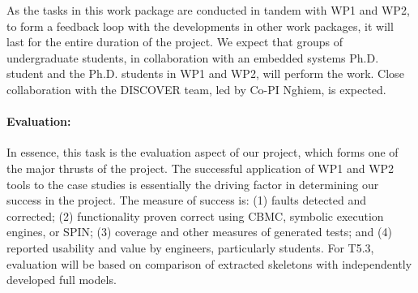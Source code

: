As the tasks in this work package are conducted in tandem with WP1 and WP2, to form a feedback loop with the developments in other work packages, it will last for the entire duration of the project.
We expect that groups of undergraduate students, in collaboration with
an embedded systems Ph.D. student and the Ph.D. students in WP1 and WP2, will
perform the work.
Close collaboration with the DISCOVER team, led by Co-PI Nghiem, is expected.

\paragraph{Evaluation:} In essence, this task is the evaluation
aspect of our project, which forms one of the major thrusts of the
project.  The successful application of WP1 and WP2 tools to the case
studies is essentially the driving factor in determining our success
in the project.
The measure of success is: (1) faults detected and corrected; (2)
functionality proven correct using CBMC, symbolic execution engines,
or SPIN; (3) coverage and other measures of generated tests; and (4)
reported usability and value by engineers,
particularly students.  For T5.3, evaluation will be based on
comparison of extracted skeletons with independently developed full 
models.



